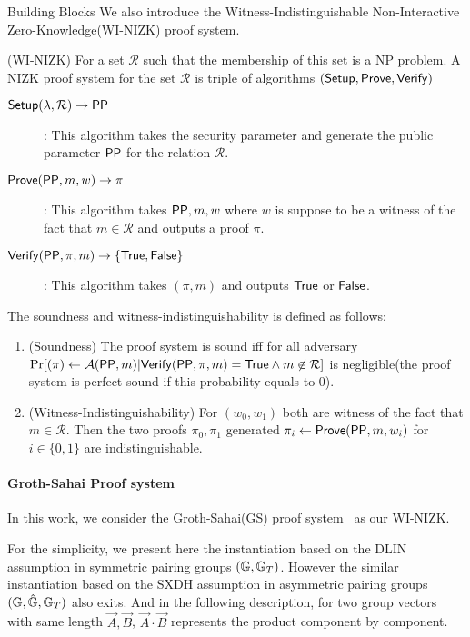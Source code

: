 \begin{subsection}{Building Blocks}
    We also introduce the Witness-Indistinguishable Non-Interactive Zero-Knowledge(WI-NIZK) proof system.
    \begin{myDef}{(WI-NIZK)} For a set $\mathcal{R}$ such that the membership of this set is a NP problem. A NIZK proof system for the set $\mathcal{R}$ is triple of algorithms $({\mathsf{Setup}}, {\mathsf{Prove}}, {\mathsf{Verify}})$
      \begin{description}
      \item[$\boldmath{{\mathsf{Setup}}(\lambda, \mathcal{R}) \to \mathsf{PP}}$]: This algorithm takes the security parameter and generate the public parameter $\mathsf{PP}$ for the relation $\mathcal{R}$. 
      \item[$\boldmath{{\mathsf{Prove}}(\mathsf{PP}, m, w) \to \pi}$]: This algorithm takes $\mathsf{PP}, m, w$ where $w$ is suppose to be a witness of the fact that $m \in \mathcal{R}$ and outputs a proof $\pi$. 
      \item[$\boldmath{{\mathsf{Verify}}(\mathsf{PP}, \pi, m) \to \{\mathsf{True}, \mathsf{False}\}}$]: This algorithm takes $(\pi, m)$ and outputs $\mathsf{True}$ or $\mathsf{False}$.
      \end{description}

      The soundness and witness-indistinguishability is defined as follows:
      \begin{enumerate}
      \item (Soundness) The proof system is sound iff for all adversary $\operatorname{Pr}[(\pi) \gets \mathcal{A}(\mathsf{PP}, m)| {\mathsf{Verify}}(\mathsf{PP}, \pi, m) = \mathsf{True} \wedge m \not \in \mathcal{R}]$ is negligible(the proof system is perfect sound if this probability equals to $0$).
      \item (Witness-Indistinguishability) For $(w_0, w_1)$ both are witness of the fact that $m \in \mathcal{R}$. Then the two proofs $\pi_0, \pi_1$ generated $\pi_i \gets {\mathsf{Prove}}(\mathsf{PP}, m, w_i)$ for $i \in \{0,1\}$ are indistinguishable.
      \end{enumerate}
      
     
      
    \end{myDef}


    \paragraph{Groth-Sahai Proof system}
    In this work, we consider the Groth-Sahai(GS) proof system~\cite{DBLP:journals/eccc/GrothS07} as our WI-NIZK.

    For the simplicity, we present here the instantiation based on the DLIN assumption in symmetric pairing groups $(\mathbb{G}, \mathbb{G}_T)$. However the similar instantiation based on the SXDH assumption in asymmetric pairing groups $(\mathbb{G}, \hat{\mathbb{G}}, \mathbb{G}_T)$ also exits. And in the following description, for two group vectors with same length $\vec{A}, \vec{B}$, $\vec{A} \cdot \vec{B}$ represents the product component by component.
    

\end{subsection}
